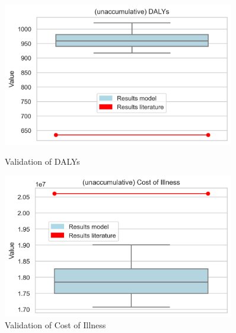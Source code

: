 \begin{figure}[!h]
    \centering
    \begin{minipage}{0.45\textwidth}
        \centering
        \includegraphics[width=0.9\textwidth]{notebooks/dalys2.png} %
        \caption{Validation of DALYs}
	    \label{fig:val_dalys}
    \end{minipage}\hfill
    \begin{minipage}{0.45\textwidth}
        \centering
        \includegraphics[width=0.9\textwidth]{notebooks/coi2.png} %
        \caption{Validation of Cost of Illness}
	    \label{fig:val_coi}
    \end{minipage}
\end{figure}

